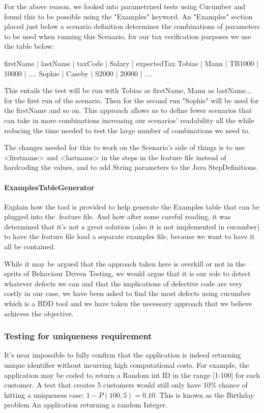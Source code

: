 For the above reason, we looked into parametrized tests using Cucumber and found this to be possible using the "Examples" keyword. 
An "Examples" section placed just below a scenario definition determines the combinations of parameters to be used when running this Scenario, for our tax verification purposes we use the table below: 
\begin{javacode}
firstName	| lastName	| taxCode 	| Salary 	| expectedTax
Tobias 		| Mann 		| TB1000 	| 10000 	| ....
Sophie		| Caseby	| S2000 	| 20000		| ....
\end{javacode}
This entails the test will be run with Tobias as firstName, Mann as lastName... for the first run of the scenario. Then for the second run "Sophie" will be used for the firstName and so on. 
This approach allows us to define fewer scenarios that can take in more combinations increasing our scenarios' readability all the while reducing the time needed to test the large number of combinations we need to. 

The changes needed for this to work on the Scenario's side of things is to use <firstname> and <lastname> in the steps in the feature file instead of hardcoding the values, and to add String parameters to the Java StepDefinitions.


\paragraph{ExamplesTableGenerator}
Explain how the tool is provided to help generate the Examples table that can be plugged into the .feature file. And how after some careful reading, it was determined that it's not a great solution (also it is not implemented in cucumber) to have the feature file load a separate examples file, because we want to have it all be contained. 
\par
While it may be argued that the approach taken here is overkill or not in the sprits of Behaviour Driven Testing, we would argue that it is our role to detect whatever defects we can and that the implications of defective code are very costly in our case, we have been asked to find the most defects using cucumber which is a BDD tool and we have taken the necessary approach that we believe achieves the objective. 

\subsubsection{Testing for uniqueness requirement}
It's near impossible to fully confirm that the application is indeed returning unique identifier without incurring high computational costs. For example, the application may be coded to return a Random int ID in the range [1-100] for each customer. A test that creates 5 customers would still only have 10\% chance of hitting a uniqueness case: 
$1 - P(100,5) = 0.10$. This is known as the Birthday problem %
An application returning a random Integer. 


